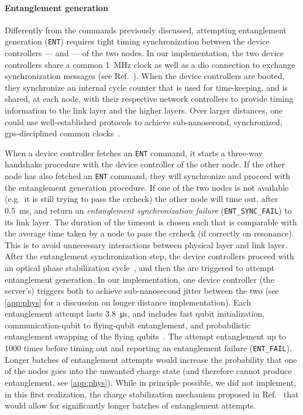 \paragraph{Entanglement generation}

Differently from the commands previously discussed, attempting entanglement generation
(\texttt{ENT}) requires tight timing synchronization between the device controllers --- and
 --- of the two nodes. In our implementation, the two device controllers share a
common \qty{1}{MHz} clock as well as a \acrshort{dio} connection to exchange synchronization
messages (see Ref.~\cite{pompili_2021_multinode}). When the device controllers are booted, they
synchronize an internal cycle counter that is used for time-keeping, and is shared, at each node,
with their respective network controllers to provide timing information to the link layer and the
higher layers. Over larger distances, one could use well-established protocols to achieve
sub-nanosecond, synchronized, \acrshort{gps}-disciplined common clocks~\cite{whiterabbit}.

When a device controller fetches an \texttt{ENT} command, it starts a three-way handshake procedure
with the device controller of the other node. If the other node has also fetched an \texttt{ENT}
command, they will synchronize and proceed with the entanglement generation procedure. If one of the
two nodes is not available (e.g.~it is still trying to pass the \acrshort{crcheck}) the other node
will time out, after \qty{0.5}{\ms}, and return an \emph{entanglement synchronization failure}
(\texttt{ENT\_SYNC\_FAIL}) to its link layer. The duration of the timeout is chosen such that is
comparable with the average time taken by a node to pass the \acrlong{crcheck} (if correctly on
resonance). This is to avoid unnecessary interactions between physical layer and link layer. After
the entanglement synchronization step, the device controllers proceed with an optical phase
stabilization cycle~\cite{pompili_2021_multinode}, and then the  are triggered to
attempt entanglement generation. In our implementation, one device controller (the server's)
triggers both  to achieve sub-nanosecond jitter between the two 
(see \cref{app:phys} for a discussion on longer distance implementation). Each entanglement attempt
lasts \qty{3.8}{\us}, and includes fast qubit initialization, communication-qubit to flying-qubit
entanglement, and probabilistic entanglement swapping of the flying
qubits~\cite{pompili_2021_multinode}. The  attempt entanglement up to \num{1000}
times before timing out and reporting an {entanglement failure} (\texttt{ENT\_FAIL}). Longer batches
of entanglement attempts would increase the probability that one of the nodes goes into the unwanted
charge state (and therefore cannot produce entanglement, see \cref{app:phys}). While in principle
possible, we did not implement, in this first realization, the charge stabilization mechanism
proposed in Ref.~\cite{humphreys_2018_delivery} that would allow for significantly longer batches of
entanglement attempts.

